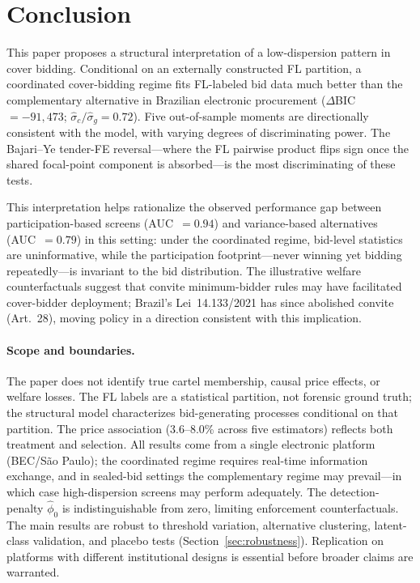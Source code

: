 
\section{Conclusion}
\label{sec:conclusion}

This paper proposes a structural interpretation of a low-dispersion
pattern in cover bidding. Conditional on an externally constructed
FL partition, a coordinated cover-bidding regime fits FL-labeled bid
data much better than the complementary alternative in Brazilian
electronic procurement ($\Delta$BIC~$= -91{,}473$;
$\hat{\sigma}_c / \hat{\sigma}_g = 0.72$). Five out-of-sample moments are directionally consistent with the
model, with varying degrees of discriminating power. The
Bajari--Ye tender-FE reversal---where the FL pairwise product
flips sign once the shared focal-point component is absorbed---is
the most discriminating of these tests.

This interpretation helps rationalize the observed performance gap
between participation-based screens (AUC~$= 0.94$) and
variance-based alternatives (AUC~$= 0.79$) in this setting: under
the coordinated regime, bid-level statistics are uninformative,
while the participation footprint---never winning yet bidding
repeatedly---is invariant to the bid distribution. The illustrative
welfare counterfactuals suggest that convite minimum-bidder rules may
have facilitated cover-bidder deployment; Brazil's Lei~14.133/2021
has since abolished convite (Art.~28), moving policy in a direction
consistent with this implication.

\paragraph{Scope and boundaries.}
The paper does not identify true cartel membership, causal price
effects, or welfare losses. The FL labels are a statistical partition,
not forensic ground truth; the structural model characterizes
bid-generating processes conditional on that partition. The price
association (3.6--8.0\% across five estimators) reflects both
treatment and selection. All results come from a single electronic
platform (BEC/S\~ao Paulo); the coordinated regime requires
real-time information exchange, and in sealed-bid settings the
complementary regime may prevail---in which case high-dispersion
screens may perform adequately. The detection-penalty
$\hat{\phi}_0$ is indistinguishable from zero, limiting enforcement
counterfactuals. The main results are robust to threshold variation,
alternative clustering, latent-class validation, and placebo tests
(Section~\ref{sec:robustness}). Replication on platforms with
different institutional designs is essential before broader claims
are warranted.

